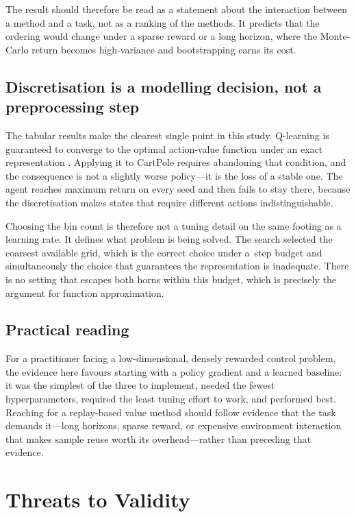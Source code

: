 \documentclass[conference]{IEEEtran}
\begin{document}
The result should therefore be read as a statement about the interaction between
a method and a task, not as a ranking of the methods. It predicts that the
ordering would change under a sparse reward or a long horizon, where the
Monte-Carlo return becomes high-variance and bootstrapping earns its cost.

\subsection{Discretisation is a modelling decision, not a preprocessing step}

The tabular results make the clearest single point in this study. Q-learning is
guaranteed to converge to the optimal action-value function under an exact
representation \cite{watkins1992}. Applying it to CartPole requires abandoning
that condition, and the consequence is not a slightly worse policy---it is the
loss of a stable one. The agent reaches maximum return on every seed and then
fails to stay there, because the discretisation makes states that require
different actions indistinguishable.

Choosing the bin count is therefore not a tuning detail on the same footing as a
learning rate. It defines what problem is being solved. The search selected the
coarsest available grid, which is the correct choice under a
\StepBudget{}\,step budget and simultaneously the choice that guarantees the
representation is inadequate. There is no setting that escapes both horns within
this budget, which is precisely the argument for function approximation.

\subsection{Practical reading}

For a practitioner facing a low-dimensional, densely rewarded control problem, the
evidence here favours starting with a policy gradient and a learned baseline: it
was the simplest of the three to implement, needed the fewest hyperparameters,
required the least tuning effort to work, and performed best. Reaching for a
replay-based value method should follow evidence that the task demands it---long
horizons, sparse reward, or expensive environment interaction that makes sample
reuse worth its overhead---rather than preceding that evidence.

\section{Threats to Validity}
\end{document}
